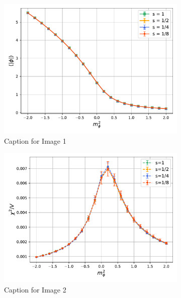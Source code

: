 \begin{figure}
    \centering
    \begin{subfigure}[b]{0.45\textwidth}
        \includegraphics[width=\textwidth]{figures/cooling/mass_scan/magnetisation.pdf}
        \caption{Caption for Image 1}
    \end{subfigure}
    \hfill
    \begin{subfigure}[b]{0.45\textwidth}
        \includegraphics[width=\textwidth]{figures/cooling/mass_scan/susceptibility.pdf}
        \caption{Caption for Image 2}
    \end{subfigure}
    \\
    \vspace{10pt}
    \begin{subfigure}[b]{0.45\textwidth}

\end{subfigure}
\end{figure}
